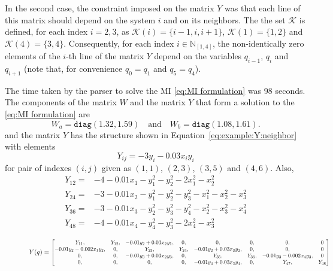 \documentclass[10pt,twocolumn,twoside]{IEEEtran}
\theoremstyle{plain}
\theoremstyle{definition}
\theoremstyle{remark}
\begin{document}
In the second case, the constraint imposed on the matrix $Y$ was that each line of this matrix should depend on the system $i$ and on its neighbors. The the set $\mathscr{K}$ is defined, for each index $i=2,3$, as $\mathscr{K}(i)=\{i-1,i,i+1\}$, $\mathscr{K}(1)=\{1,2\}$ and $\mathscr{K}(4)=\{3,4\}$. Consequently, for each index $i\in\mathbb{N}_{[1,4]}$, the non-identically zero elements of the $i$-th line of the matrix $Y$ depend on the variables $q_{i-1}$, $q_i$ and $q_{i+1}$ (note that, for convenience $q_0=q_1$ and $q_5=q_4$).

The time taken by the parser to solve the MI \eqref{eq:MI formulation} was 98 seconds. The components of the matrix $W$ and the matrix $Y$ that form a solution to the \eqref{eq:MI formulation} are
\begin{equation*}
		W_a=\mathbin{\mathtt{diag}}\left(
 1.32,1.59\right)\quad\text{and}\quad W_b=\mathbin{\mathtt{diag}}\left(1.08,1.61\right).
\end{equation*}
and the matrix $Y$ has the structure shown in Equation~\eqref{eq:example:Y:neighbor} with elements
\begin{equation*}
	Y_{ij}=-3y_i-0.03x_iy_i
\end{equation*}
for pair of indexes $(i,j)$ given as $(1,1)$, $(2,3)$, $(3,5)$ and $(4,6)$. Also, 
\begin{align*}
	Y_{12}=&-4-0.01x_1-y_1^2-y_2^2-2x_1^2-x_2^2\\	
	Y_{24}=&-3-0.01x_2-y_1^2-y_2^2-y_3^2-x_1^2-x_2^2-x_3^2\\	
	Y_{36}=&-3-0.01x_3-y_2^2-y_3^2-y_4^2-x_2^2-x_3^2-x_4^2\\	
	Y_{48}=&-4-0.01x_4-y_4^2-y_3^2-2x_4^2-x_3^2
\end{align*}

\begin{figure*}
\begin{equation}\label{eq:example:Y:neighbor}
	Y(q)=\scalebox{0.85}{$\begin{bmatrix}
	Y_{11},&Y_{12},&-0.01y_2+0.03x_2y_1,&0,&0,&0,&0,&0\\
	-0.01y_2-0.002x_1y_2,&0,&Y_{23},&Y_{24},&-0.01y_2+0.03x_3y_2,&0,&0,&0\\
	0,&0,&-0.01y_3+0.03x_2y_3,&0,&Y_{35},&Y_{36},&-0.01y_3-0.002x_4y_3,&0\\
	0,&0,&0,&0,&-0.01y_4+0.03x_3y_4,&0,&Y_{47},&Y_{48}
	\end{bmatrix}$}
\end{equation}
\end{figure*}
 
\end{document}
